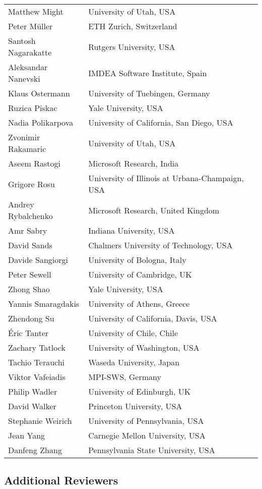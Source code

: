 \begin{tabular}{@{}p{\namewidth}l@{}}
Matthew Might
  & University of Utah, USA \\
Peter Müller
  & ETH Zurich, Switzerland \\
Santosh Nagarakatte
  & Rutgers University, USA \\
Aleksandar Nanevski
  & IMDEA Software Institute, Spain \\
Klaus Ostermann
  & University of Tuebingen, Germany \\
Ruzica Piskac
  & Yale University, USA \\
Nadia Polikarpova
  & University of California, San Diego, USA \\
Zvonimir Rakamaric
  & University of Utah, USA \\
Aseem Rastogi
  & Microsoft Research, India \\
Grigore Rosu
  & University of Illinois at Urbana-Champaign, USA\\
Andrey Rybalchenko
  & Microsoft Research, United Kingdom \\
Amr Sabry
  & Indiana University, USA \\
David Sands
  & Chalmers University of Technology, USA \\
Davide Sangiorgi
  & University of Bologna, Italy \\
Peter Sewell
  & University of Cambridge, UK \\
Zhong Shao
  & Yale University, USA \\
Yannis Smaragdakis
  & University of Athens, Greece \\
Zhendong Su
  & University of California, Davis, USA \\
Éric Tanter
  & University of Chile, Chile \\
Zachary Tatlock
  & University of Washington, USA \\
Tachio Terauchi
  & Waseda University, Japan \\
Viktor Vafeiadis
  & MPI-SWS, Germany \\
Philip Wadler
  & University of Edinburgh, UK \\
David Walker
  & Princeton University, USA \\
Stephanie Weirich
  & University of Pennsylvania, USA \\
Jean Yang
  & Carnegie Mellon University, USA \\
Danfeng Zhang
  & Pennsylvania State University, USA \\
\end{tabular}

\subsection*{\sffamily Additional Reviewers}


